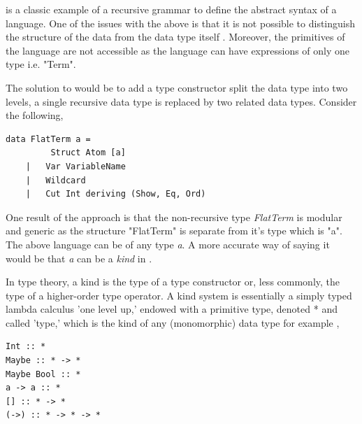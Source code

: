 \documentclass[thesis-solanki.tex]{subfiles}
\begin{document}
 is a classic example of a recursive grammar to define the
abstract syntax of a language.
One of the issues with the above is that it is not possible to distinguish the structure of the data from the
data type itself \cite{sheard2004two}.
Moreover, the primitives of the language are not accessible as the language can have expressions of only one
type i.e.
"Term".

The solution to would be to add a type constructor split the data type into two levels, a single recursive
data type is replaced by two related data types.
Consider the following,\par
\begin{verbatim}
data FlatTerm a = 
		 Struct Atom [a]
	|	Var VariableName
	|	Wildcard
	|	Cut Int deriving (Show, Eq, Ord)
\end{verbatim}

One result of the approach is that the non-recursive type \textit{FlatTerm} is modular and generic as the structure "FlatTerm"
is separate 
from it's
type which is "a". 
The above language can be of any type \textit{a}. A more accurate way of saying it would be that \textit{a} can be a \textit{kind} in 
. 

In type theory, a kind is the type of a type constructor or, less commonly, the type of a higher-order type operator. A kind system is 
essentially a simply typed lambda calculus 'one level up,' endowed with a primitive type, denoted * and called 'type,' which is the kind of 
any (monomorphic) data type for example \cite{website:kindhaskellwiki},

\begin{verbatim}
Int :: *
Maybe :: * -> *
Maybe Bool :: *
a -> a :: *
[] :: * -> *
(->) :: * -> * -> *
\end{verbatim}  
\end{document}
